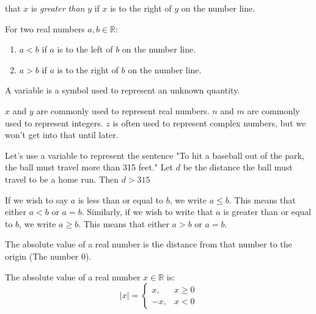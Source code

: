         that $x$ is \textit{greater than} $y$ if $x$ is to the
        right of $y$ on the number line.
        \begin{properties}
            For two real numbers $a,b\in \mathbb{R}$:
            \begin{enumerate}
                \item $a<b$ if $a$ is to the left of $b$ on the number line.
                \item $a>b$ if $a$ is to the right of $b$ on the number line.
            \end{enumerate}
        \end{properties}
        \begin{definition}
        A variable is a symbol used to represent an unknown quantity.
        \end{definition}
        \begin{example}
        $x$ and $y$ are commonly used to represent real numbers. $n$ and $m$ are commonly used to represent integers. $z$ is often used to represent complex numbers, but we won't get into that until later.
        \end{example}
        \begin{example}
        Let's use a variable to represent the sentence "To hit a baseball out of the park, the ball must travel more than 315 feet." Let $d$ be the distance the ball must travel to be a home run. Then $d>315$
        \end{example}
        \begin{notation}
        If we wish to say $a$ is less than or equal to $b$, we write $a\leq b$. This means that either $a<b$ or $a=b$. Similarly, if we wish to write that $a$ is greater than or equal to $b$, we write $a\geq b$. This means that either $a>b$ or $a=b$.
        \end{notation}
        The absolute value of a real number is the distance from that number to the origin (The number $0$).
        \begin{definition}
            The absolute value of a real number
            $x\in \mathbb{R}$ is:
            \begin{equation}
                |x|=
                \begin{cases}
                    x,&x\geq{0}\\
                    \minus{x},&x<0
                \end{cases}
            \end{equation}
        \end{definition}
